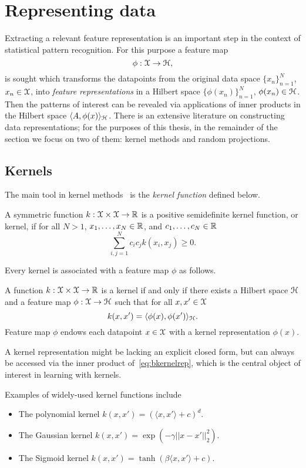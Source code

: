 \section{Representing data}
\label{sec:b-representing-data}
Extracting a relevant feature representation is an important step in the context of statistical pattern recognition. For this purpose a feature map 
\[
\phi: \mathcal{X} \rightarrow \mathcal{H},
\]
is sought which transforms the datapoints from the original data space $\{x_n\}_{n=1}^{N}$, $x_n \in \mathcal{X}$, into \emph{feature representations} in a Hilbert space $\{\phi(x_n)\}_{n=1}^{N}$, $\phi(x_n) \in \mathcal{H}$. Then the patterns of interest can be revealed via applications of inner products in the Hilbert space $\langle A, \phi(x) \rangle_{\mathcal{H}}$. There is an extensive literature on constructing data representations; for the purposes of this thesis, in the remainder of the section we focus on two of them: kernel methods and random projections.


\subsection{Kernels}
\label{subsec:b-kernels}

The main tool in kernel methods~\cite{scholkopf02} is the \emph{kernel function} defined below.
\begin{ndefn} \label{def:bkernelfun}
	A symmetric function $k: \mathcal{X} \times \mathcal{X} \rightarrow \mathbb{R} $ is a positive semidefinite kernel function, or kernel, if for all $N>1$, $x_1, \ldots, x_N \in \mathbb{R}$, and $c_1, \ldots, c_N \in \mathbb{R}$ 
	\[
	\sum_{i,j=1}^{N} c_ic_j k(x_i, x_j) \geq 0.
	\]
\end{ndefn}
Every kernel is associated with a feature map $\phi$ as follows.
\begin{ndefn} \label{def:bkernelrepr}
	 A function $k: \mathcal{X} \times \mathcal{X} \rightarrow \mathbb{R}$ is a kernel if and only if there exists a Hilbert space $\mathcal{H}$ and a feature map $\phi: \mathcal{X} \rightarrow \mathcal{H}$ such that for all $x, x' \in \mathcal{X}$
	 \[
	 \label{eq:bkernelrep}
	 k(x,x') = \langle \phi(x), \phi(x') \rangle_{\mathcal{H}}.
	 \]
	 Feature map $\phi$ endows each datapoint $x \in \mathcal{X}$ with a kernel representation $\phi(x)$.
\end{ndefn}
A kernel representation might be lacking an explicit closed form, but can always be accessed via the inner product of~\cref{eq:bkernelrep}, which is the central object of interest in learning with kernels.

Examples of widely-used kernel functions include
\begin{itemize}
	\item The polynomial kernel $k(x,x') = \left(\langle x, x'\rangle + c\right)^d$.
	\item The Gaussian kernel $k(x,x') = \exp(-\gamma||x-x'||_{2}^2)$.
	\item The Sigmoid kernel $k(x,x') = \tanh(\beta\langle x, x'\rangle + c)$.
\end{itemize}

